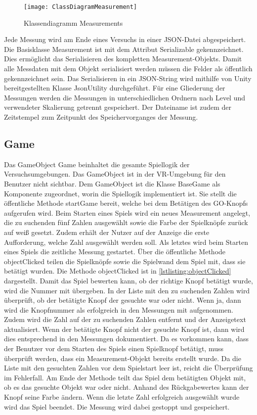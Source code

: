 \begin{figure}[!htbp]
	\centering
	\texttt{[image: ClassDiagramMeasurement]}
	\caption[Klassendiagramm Measurements]{Klassendiagramm Measurements}
	\label{fig:ClassDiagramMeasurement}
\end{figure}

Jede Messung wird am Ende eines Versuchs in einer JSON-Datei abgespeichert. Die Basisklasse Measurement ist mit dem Attribut Serializable gekennzeichnet. Dies ermöglicht das Serialisieren des kompletten Measurement-Objekts. Damit alle Messdaten mit dem Objekt serialisiert werden müssen die Felder als öffentlich gekennzeichnet sein. Das Serialisieren in ein JSON-String wird mithilfe von Unity bereitgestellten Klasse JsonUtility durchgeführt. Für eine Gliederung der Messungen werden die Messungen in unterschiedlichen Ordnern nach Level und verwendeter Skalierung getrennt gespeichert. Der Dateiname ist zudem der Zeitstempel zum Zeitpunkt des Speichervorganges der Messung.

\subsection{Game}
\label{section:game}
Das GameObject \glqq Game\grqq{} beinhaltet die gesamte Spiellogik der Versuchsumgebungen. Das GameObject ist in der \ac{VR}-Umgebung für den Benutzer nicht sichtbar. Dem GameObject ist die Klasse {\ttfamily BaseGame} als Komponente zugeordnet, worin die Spiellogik implementiert ist. Sie stellt die öffentliche Methode {\ttfamily startGame} bereit, welche bei dem Betätigen des GO-Knopfs aufgerufen wird. Beim Starten eines Spiels wird ein neues Measurement angelegt, die zu suchenden fünf Zahlen ausgewählt sowie die Farbe der Spielknöpfe zurück auf weiß gesetzt. Zudem erhält der Nutzer auf der Anzeige die erste Aufforderung, welche Zahl ausgewählt werden soll. Als letztes wird beim Starten eines Spiels die zeitliche Messung gestartet. Über die öffentliche Methode {\ttfamily objectClicked} teilen die Spielknöpfe sowie die Spielwand dem Spiel mit, dass sie betätigt wurden. Die Methode objectClicked ist in \autoref{lstlisting:objectClicked} dargestellt. Damit das Spiel bewerten kann, ob der richtige Knopf betätigt wurde, wird die Nummer mit übergeben. In der Liste mit den zu suchenden Zahlen wird überprüft, ob der betätigte Knopf der gesuchte war oder nicht. Wenn ja, dann wird die Knopfnummer als erfolgreich in den Messungen mit aufgenommen. Zudem wird die Zahl auf der zu suchenden Zahlen entfernt und der Anzeigetext aktualisiert. Wenn der betätigte Knopf nicht der gesuchte Knopf ist, dann wird dies entsprechend in den Messungen dokumentiert. Da es vorkommen kann, dass der Benutzer vor dem Starten des Spiels einen Spielknopf betätigt, muss überprüft werden, dass ein Measurement-Objekt bereits erstellt wurde. Da die Liste mit den gesuchten Zahlen vor dem Spielstart leer ist, reicht die Überprüfung im Fehlerfall. Am Ende der Methode teilt das Spiel dem betätigten Objekt mit, ob es das gesuchte Objekt war oder nicht. Anhand des Rückgabewertes kann der Knopf seine Farbe ändern. Wenn die letzte Zahl erfolgreich ausgewählt wurde wird das Spiel beendet. Die Messung wird dabei gestoppt und gespeichert.\\


